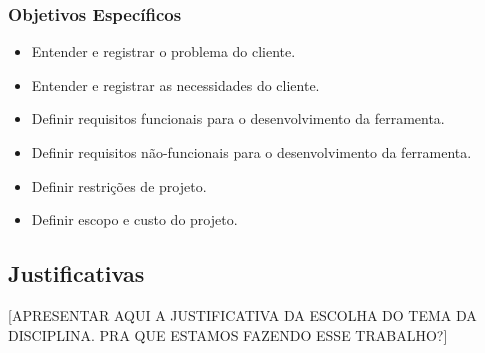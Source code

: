 \subsubsection{Objetivos Específicos}
\begin{itemize}
	\item Entender e registrar o problema do cliente.
	\item Entender e registrar as necessidades do cliente.
	\item Definir requisitos funcionais para o desenvolvimento da ferramenta.
	\item Definir requisitos não-funcionais para o desenvolvimento da ferramenta.
	\item Definir restrições de projeto.
	\item Definir escopo e custo do projeto.
\end{itemize}


\subsection{Justificativas} %
\label{sub:justificativas}

[APRESENTAR AQUI A JUSTIFICATIVA DA ESCOLHA DO TEMA DA DISCIPLINA. PRA QUE ESTAMOS FAZENDO ESSE TRABALHO?]
